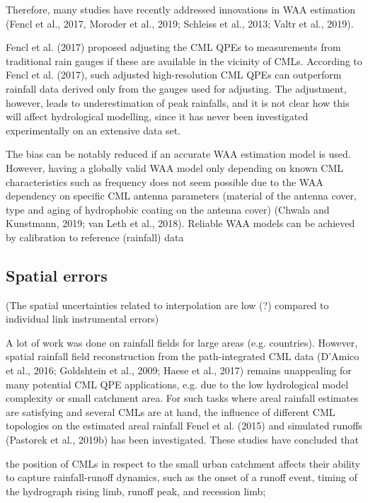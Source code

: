 \documentclass{ctuthesis}\usepackage[]{graphicx}\usepackage[]{color}
\begin{document}
Therefore, many studies have recently addressed innovations in WAA estimation (Fencl et al., 2017, Moroder et al., 2019; Schleiss et al., 2013; Valtr et al., 2019).

Fencl et al. (2017) proposed adjusting the CML QPEs to measurements from traditional rain gauges if these are available in the vicinity of CMLs. According to Fencl et al. (2017), such adjusted high-resolution CML QPEs can outperform rainfall data derived only from the gauges used for adjusting. The adjustment, however, leads to underestimation of peak rainfalls, and it is not clear how this will affect hydrological modelling, since it has never been investigated experimentally on an extensive data set.

The bias can be notably reduced if an accurate WAA estimation model is used. However, having a globally valid WAA model only depending on known CML characteristics such as frequency does not seem possible due to the WAA dependency on specific CML antenna parameters (material of the antenna cover, type and aging of hydrophobic coating on the antenna cover) (Chwala and Kunstmann, 2019; van Leth et al., 2018). Reliable WAA models can be achieved by calibration to reference (rainfall) data



\subsection{Spatial errors}
(The spatial uncertainties related to interpolation are low (?) compared to individual link instrumental errors)

A lot of work was done on rainfall fields for large areas (e.g. countries). However, spatial rainfall field reconstruction from the path-integrated CML data (D’Amico et al., 2016; Goldshtein et al., 2009; Haese et al., 2017) remains unappealing for many potential CML QPE applications, e.g. due to the low hydrological model complexity or small catchment area. For such tasks where areal rainfall estimates are satisfying and several CMLs are at hand, the influence of different CML topologies on the estimated areal rainfall Fencl et al. (2015) and simulated runoffs (Pastorek et al., 2019b) has been investigated. These studies have concluded that

the position of CMLs in respect to the small urban catchment affects their ability to capture rainfall-runoff dynamics, such as the onset of a runoff event, timing of the hydrograph rising limb, runoff peak, and recession limb;
\end{document}
